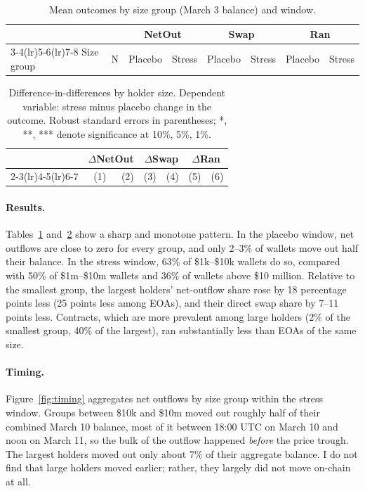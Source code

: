 \documentclass[11pt]{article}
\begin{document}
\begin{table}[t]
\centering\small
\caption{Mean outcomes by size group (March 3 balance) and window.}
\label{tab:means}
\begin{tabular}{lrrrrrrr}
\toprule
 & & \multicolumn{2}{c}{NetOut} & \multicolumn{2}{c}{Swap} & \multicolumn{2}{c}{Ran} \\
\cmidrule(lr){3-4}\cmidrule(lr){5-6}\cmidrule(lr){7-8}
Size group & N & Placebo & Stress & Placebo & Stress & Placebo & Stress \\
\midrule

\end{tabular}
\end{table}

\begin{table}[t]
\centering\small
\caption{Difference-in-differences by holder size. Dependent variable: stress minus placebo change in the outcome. Robust standard errors in parentheses; *, **, *** denote significance at 10\%, 5\%, 1\%.}
\label{tab:reg}
\begin{tabular}{lrrrrrr}
\toprule
 & \multicolumn{2}{c}{$\Delta$NetOut} & \multicolumn{2}{c}{$\Delta$Swap} & \multicolumn{2}{c}{$\Delta$Ran} \\
\cmidrule(lr){2-3}\cmidrule(lr){4-5}\cmidrule(lr){6-7}
 & (1) & (2) & (3) & (4) & (5) & (6) \\
\midrule

\end{tabular}
\end{table}

\paragraph{Results.} Tables~\ref{tab:means} and~\ref{tab:reg} show a sharp and monotone pattern. In the placebo window, net outflows are close to zero for every group, and only 2--3\% of wallets move out half their balance. In the stress window, 63\% of \$1k--\$10k wallets do so, compared with 50\% of \$1m--\$10m wallets and 36\% of wallets above \$10 million. Relative to the smallest group, the largest holders' net-outflow share rose by 18 percentage points less (25 points less among EOAs), and their direct swap share by 7--11 points less. Contracts, which are more prevalent among large holders (2\% of the smallest group, 40\% of the largest), ran substantially less than EOAs of the same size.

\paragraph{Timing.} Figure~\ref{fig:timing} aggregates net outflows by size group within the stress window. Groups between \$10k and \$10m moved out roughly half of their combined March 10 balance, most of it between 18:00 UTC on March 10 and noon on March 11, so the bulk of the outflow happened \emph{before} the price trough. The largest holders moved out only about 7\% of their aggregate balance. I do not find that large holders moved earlier; rather, they largely did not move on-chain at all.
\end{document}
